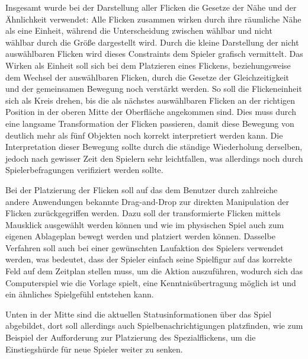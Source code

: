 Insgesamt wurde bei der Darstellung aller Flicken die Gesetze der Nähe und der Ähnlichkeit verwendet: Alle Flicken zusammen wirken durch ihre räumliche Nähe als eine Einheit, während die Unterscheidung zwischen wählbar und nicht wählbar durch die Größe dargestellt wird. Durch die kleine Darstellung der nicht auswählbaren Flicken wird dieses Constraints dem Spieler grafisch vermittelt. Das Wirken als Einheit soll sich bei dem Platzieren eines Flickens, beziehungsweise dem Wechsel der auswählbaren Flicken, durch die Gesetze der Gleichzeitigkeit und der gemeinsamen Bewegung noch verstärkt werden. So soll die Flickeneinheit sich als Kreis drehen, bis die als nächstes auswählbaren Flicken an der richtigen Position in der oberen Mitte der Oberfläche angekommen sind. Dies muss durch eine langsame Transformation der Flicken passieren, damit diese Bewegung von deutlich mehr als fünf Objekten noch korrekt interpretiert werden kann. Die Interpretation dieser Bewegung sollte durch die ständige Wiederholung derselben, jedoch nach gewisser Zeit den Spielern sehr leichtfallen, was allerdings noch durch Spielerbefragungen verifiziert werden sollte.

Bei der Platzierung der Flicken soll auf das dem Benutzer durch zahlreiche andere Anwendungen bekannte Drag-and-Drop zur direkten Manipulation der Flicken zurückgegriffen werden. Dazu soll der transformierte Flicken mittels Mausklick ausgewählt werden können und wie im physischen Spiel auch zum eigenen Ablageplan bewegt werden und platziert werden können. Dasselbe Verfahren soll auch bei einer gewünschten Laufaktion des Spielers verwendet werden, was bedeutet, dass der Spieler einfach seine Spielfigur auf das korrekte Feld auf dem Zeitplan stellen muss, um die Aktion auszuführen, wodurch sich das Computerspiel wie die Vorlage spielt, eine Kenntnisübertragung möglich ist und ein ähnliches Spielgefühl entstehen kann.

\pagebreak

Unten in der Mitte sind die aktuellen Statusinformationen über das Spiel abgebildet, dort soll allerdings auch Spielbenachrichtigungen platzfinden, wie zum Beispiel der Aufforderung zur Platzierung des Spezialflickens, um die Einstiegshürde für neue Spieler weiter zu senken.

